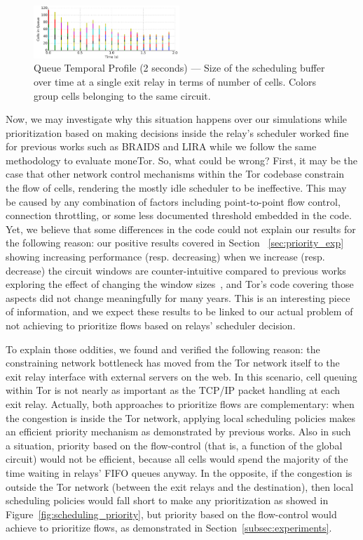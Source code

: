 \begin{figure} \centering
  \includegraphics[width=0.49\textwidth]{images/scheduling_close.png}
  \caption[Queue Temporal Profile (2 seconds)]{Queue Temporal Profile (2
    seconds) --- Size of the scheduling buffer over time at a single exit relay
    in terms of number of cells. Colors group cells belonging to the same
    circuit.}
  \label{fig:scheduling_close}
\end{figure}

Now, we may investigate why this situation happens over our simulations while
prioritization based on making decisions inside the relay's scheduler worked
fine for previous works such as BRAIDS and LIRA while we follow the same
methodology to evaluate moneTor. So, what could be wrong? First, it may be the
case that other network control mechanisms within the Tor codebase constrain the
flow of cells, rendering the mostly idle scheduler to be ineffective. This may
be caused by any combination of factors including point-to-point flow control,
connection throttling, or some less documented threshold embedded in the code.
Yet, we believe that some differences in the code could not explain our results
for the following reason: our positive results covered in Section~
\ref{sec:priority_exp} showing increasing performance (resp. decreasing) when we
increase (resp. decrease) the circuit windows are counter-intuitive compared to
previous works exploring the effect of changing the window
sizes~\cite{archive-2009-mail, kiraly2008solving, dingledine2009performance},
and Tor's code covering those aspects did not change meaningfully for many
years. This is an interesting piece of information, and we expect these results
to be linked to our actual problem of not achieving to prioritize flows based on
relays' scheduler decision.

To explain those oddities, we found and verified the following reason: the
constraining network bottleneck has moved from the Tor network itself to the
exit relay interface with external servers on the web. In this scenario, cell
queuing within Tor is not nearly as important as the TCP/IP packet handling at
each exit relay. Actually, both approaches to prioritize flows are
complementary: when the congestion is inside the Tor network, applying local
scheduling policies makes an efficient priority mechanism as demonstrated by
previous works. Also in such a situation, priority based on the flow-control
(that is, a function of the global circuit) would not be efficient, because all
cells would spend the majority of the time waiting in relays' FIFO queues
anyway. In the opposite, if the congestion is outside the Tor network (between
the exit relays and the destination), then local scheduling policies would fall
short to make any prioritization as showed in
Figure~\ref{fig:scheduling_priority}, but priority based on the flow-control
would achieve to prioritize flows, as demonstrated in
Section~\ref{subsec:experiments}.

